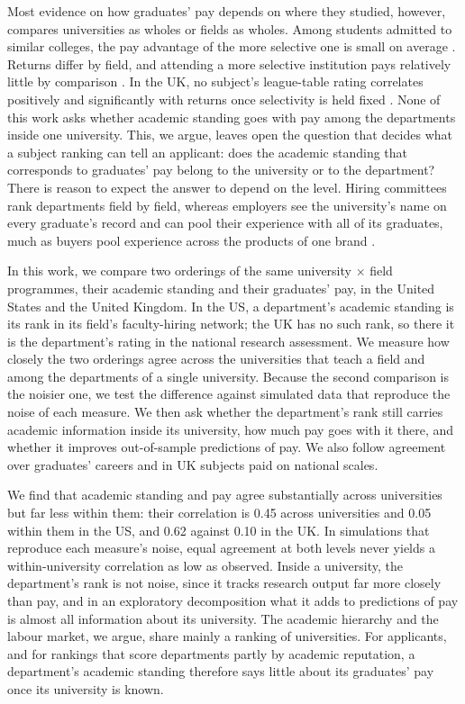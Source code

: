 \documentclass[11pt]{article}
\begin{document}
Most evidence on how graduates' pay depends on where they studied, however, compares universities as wholes or fields
as wholes. Among students admitted to similar colleges, the pay advantage of the more selective one is small on
average \citep{dale2002estimating}. Returns differ by field, and attending a more selective institution pays
relatively little by comparison \citep{kirkeboen2016field}. In the UK, no subject's league-table rating correlates
positively and significantly with returns once selectivity is held fixed \citep{britton2022how}. None of this work
asks whether academic standing goes with pay among the departments inside one university. This, we argue, leaves
open the question that decides what a subject ranking can tell an applicant: does the academic standing that
corresponds to graduates' pay belong to the university or to the department? There is reason to expect the answer to
depend on the level. Hiring committees rank departments field by field, whereas employers see the university's name
on every graduate's record and can pool their experience with all of its graduates, much as buyers pool experience
across the products of one brand \citep{wernerfelt1988umbrella, tadelis1999name}.

In this work, we compare two orderings of the same university $\times$ field programmes, their academic standing and
their graduates' pay, in the United States and the United Kingdom. In the US, a department's academic standing is its
rank in its field's faculty-hiring network; the UK has no such rank, so there it is the department's rating in the
national research assessment. We measure how closely the two orderings agree across the universities that teach a
field and among the departments of a single university. Because the second comparison is the noisier one, we test
the difference against simulated data that reproduce the noise of each measure. We then ask whether the department's
rank still carries academic information inside its university, how much pay goes with it there, and whether it
improves out-of-sample predictions of pay. We also follow agreement over graduates' careers and in UK subjects paid on
national scales.

We find that academic standing and pay agree substantially across universities but far less within them: their
correlation is 0.45 across universities and 0.05 within them in the US, and 0.62 against 0.10 in the UK. In
simulations that reproduce each measure's noise, equal agreement at both levels never yields a within-university
correlation as low as observed. Inside a university, the department's rank is not noise, since it tracks research
output far more closely than pay, and in an exploratory decomposition what it adds to predictions of pay is almost
all information about its university. The academic hierarchy and the labour market, we argue, share mainly a ranking
of universities. For applicants, and for rankings that score departments partly by academic reputation, a
department's academic standing therefore says little about its graduates' pay once its university is known.
\end{document}
